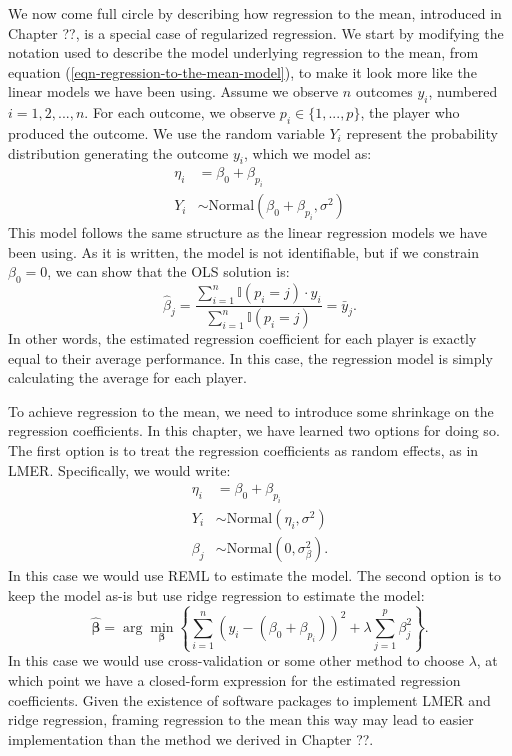 \documentclass{article}
\begin{document}
  We now come full circle by describing how regression to the mean, introduced in Chapter ??, is a special case of regularized regression. We start by modifying the notation used to describe the model underlying regression to the mean, from equation (\ref{eqn-regression-to-the-mean-model}), to make it look more like the linear models we have been using. Assume we observe $n$ outcomes $y_i$, numbered $i = 1, 2, ..., n$. For each outcome, we observe $p_i \in \{1, ..., p\}$, the player who produced the outcome. We use the random variable $Y_i$ represent the probability distribution generating the outcome $y_i$, which we model as:
  \begin{align*}
    \eta_i &= \beta_0 + \beta_{p_i}\\
    Y_i &\sim \mbox{Normal}(\beta_0 + \beta_{p_i}, \sigma^2)
  \end{align*}
  This model follows the same structure as the linear regression models we have been using. As it is written, the model is not identifiable, but if we constrain $\beta_0 = 0$, we can show that the OLS solution is:
  \begin{equation*}
    \hat\beta_{j} = \frac{\sum_{i = 1}^n \mathbb{I}(p_i = j) \cdot y_i}{\sum_{i = 1}^n \mathbb{I}(p_i = j)} = \bar y_{j}.
  \end{equation*}
  In other words, the estimated regression coefficient for each player is exactly equal to their average performance. In this case, the regression model is simply calculating the average for each player.

  To achieve regression to the mean, we need to introduce some shrinkage on the regression coefficients. In this chapter, we have learned two options for doing so. The first option is to treat the regression coefficients as random effects, as in LMER. Specifically, we would write:
  \begin{equation*}
    \begin{split}
      \eta_i &= \beta_0 + \beta_{p_i}\\
      Y_i &\sim \mbox{Normal}(\eta_i, \sigma^2)\\
      \beta_j &\sim \mbox{Normal}(0, \sigma^2_\beta).
    \end{split}
  \end{equation*}
  In this case we would use REML to estimate the model. The second option is to keep the model as-is but use ridge regression to estimate the model:
  \begin{equation*}
    \label{eqn-ridge-regression}
    \boldsymbol{\hat\beta} = \arg\min_{\boldsymbol{\beta}} \left\{ \sum_{i=1}^n (y_i - (\beta_0 + \beta_{p_i}))^2 + \lambda \sum_{j = 1}^p \beta_j^2 \right\}.
  \end{equation*}
  In this case we would use cross-validation or some other method to choose $\lambda$, at which point we have a closed-form expression for the estimated regression coefficients. Given the existence of software packages to implement LMER and ridge regression, framing regression to the mean this way may lead to easier implementation than the method we derived in Chapter ??.
\end{document}
